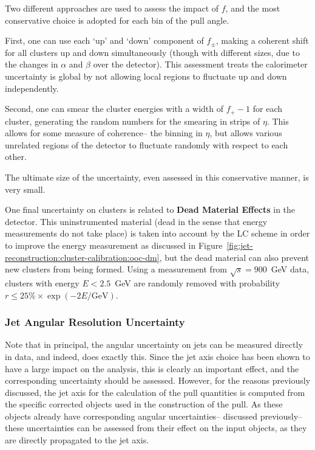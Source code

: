 	Two different approaches are used to assess the impact of $f$, and the most conservative choice is adopted for each bin of the pull angle.

	First, one can use each `up' and `down' component of $f_\pm$, making a coherent shift for all clusters up and down simultaneously (though with different sizes, due to the changes in $\alpha$ and $\beta$ over the detector). This assessment treats the calorimeter uncertainty is global by not allowing local regions to fluctuate up and down independently.

	Second, one can smear the cluster energies with a width of $f_+ - 1$ for each cluster, generating the random numbers for the smearing in strips of $\eta$. This allows for some measure of coherence-- the binning in $\eta$, but allows various unrelated regions of the detector to fluctuate randomly with respect to each other.

	The ultimate size of the uncertainty, even assessed in this conservative manner, is very small.

	One final uncertainty on clusters is related to \textbf{Dead Material Effects} in the detector. This uninstrumented material (dead in the sense that energy measurements do not take place) is taken into account by the LC scheme in order to improve the energy measurement as discussed in Figure~\ref{fig:jet-reconstruction:cluster-calibration:ooc-dm}, but the dead material can also prevent new clusters from being formed. Using a measurement from $\sqrt{s} = 900$~GeV data, clusters with energy $E < 2.5$~GeV  are randomly removed with probability $r\leq 25\%\times \exp(-2E/\text{GeV})$. 

	\subsubsection{Jet Angular Resolution Uncertainty}

	Note that in principal, the angular uncertainty on jets can be measured directly in data, and indeed,  does exactly this. Since the jet axis choice has been shown to have a large impact on the analysis, this is clearly an important effect, and the corresponding uncertainty should be assessed. However, for the reasons previously discussed, the jet axis for the calculation of the pull quantities is computed from the specific corrected objects used in the construction of the pull. As these objects already have corresponding angular uncertainties-- discussed previously-- these uncertainties can be assessed from their effect on the input objects, as they are directly propagated to the jet axis.  

